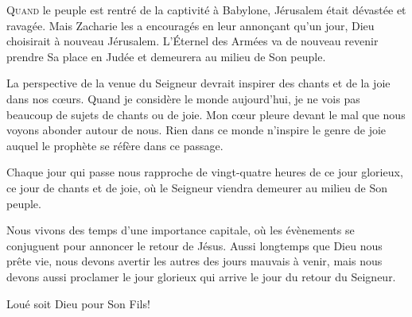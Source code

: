 



\lettrine{Q}{uand} le peuple est rentré de la captivité à Babylone,
 Jérusalem était dévastée et ravagée. Mais Zacharie les a encouragés
 en leur annon\c{c}ant qu'un jour, Dieu choisirait à nouveau Jérusalem.
 L'Éternel des Armées va de nouveau revenir prendre Sa place en Judée
 et demeurera au milieu de Son peuple. 


La perspective de la venue du Seigneur devrait inspirer des chants
 et de la joie dans nos c\oe{}urs. Quand je considère le monde aujourd'hui,
 je ne vois pas beaucoup de sujets de chants ou de joie.
 Mon c\oe{}ur pleure devant le mal que nous voyons abonder autour de nous.
 Rien dans ce monde n'inspire le genre de joie auquel le prophète
 se réfère dans ce passage. 

Chaque jour qui passe nous rapproche de vingt-quatre heures de ce jour
 glorieux, ce jour de chants et de joie, où le Seigneur viendra demeurer
 au milieu de Son peuple. 

Nous vivons des temps d'une importance capitale, où les évènements
 se conjuguent pour annoncer le retour de Jésus. Aussi longtemps que Dieu
 nous prête vie, nous devons avertir les autres des jours mauvais à venir,
 mais nous devons aussi proclamer le jour glorieux qui arrive
 \ocadr le jour du retour du Seigneur. 

Loué soit Dieu pour Son Fils! 

\dvrule




